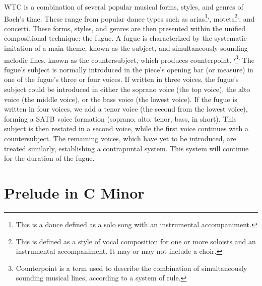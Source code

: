 WTC is a combination of several popular musical forms, styles, and genres of Bach's time. These range from popular dance types such as arias\footnote{This is a dance defined as a solo song with an instrumental accompaniment.}\textsuperscript{,}\autocite{Marshall_Emery_2019}, motets\footnote{This is defined as a style of vocal composition for one or more soloists and an instrumental accompaniment. It may or may not include a choir.}\textsuperscript{,}\autocite{Marshall_Emery_2019}, and concerti. These forms, styles, and genres are then presented within the unified compositional technique: the fugue. A fugue is characterized by the systematic imitation of a main theme, known as the subject, and simultaneously sounding melodic lines, known as the countersubject, which produces counterpoint. \autocite{Marshall_Emery_2019}\textsuperscript{,}\footnote{Counterpoint is a term used to describe the combination of simultaneously sounding musical lines, according to a system of rule.}\textsuperscript{,}\autocite{Sachs_Dahlhaus_2001} The fugue's subject is normally introduced in the piece's opening bar (or measure) in one of the fugue's three or four voices. If written in three voices, the fugue's subject could be introduced in either the soprano voice (the top voice), the alto voice (the middle voice), or the bass voice (the lowest voice). If the fugue is written in four voices, we add a tenor voice (the second from the lowest voice), forming a SATB voice formation (soprano, alto, tenor, bass, in short). This subject is then restated in a second voice, while the first voice continues with a countersubject. The remaining voices, which have yet to be introduced, are treated similarly, establishing a contrapuntal system. This system will continue for the duration of the fugue.

\section{Prelude in C Minor}

